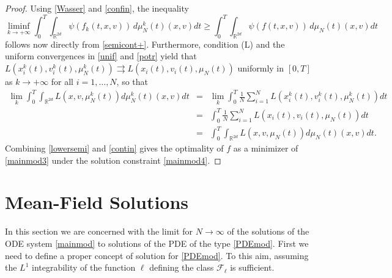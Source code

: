 \documentclass[11pt]{article}
\theoremstyle{plain}
\theoremstyle{definition}
\theoremstyle{remark}
\numberwithin{equation}{section}
\begin{document}
\begin{proof}
Using \eqref{Wasser} and \eqref{confin}, the inequality
\begin{equation}\label{lowersemi}
\liminf_{k\to +\infty}\int_{0}^T \int_{\mathbb R^{2d}} \psi(f_k(t,x,v))\, d \mu_N^k(t)(x,v) dt \ge \int_{0}^T \int_{\mathbb R^{2d}} \psi(f(t,x,v))\, d \mu_N(t)(x,v) dt
\end{equation}
follows now directly from \eqref{semicont+}. Furthermore, condition (L) and the uniform convergences in \eqref{unif} and \eqref{potr} yield that $L(x_i^k(t),v_i^k(t),\mu_N^k(t))\rightrightarrows L(x_i(t),v_i(t),\mu_N(t))$ uniformly in $[0, T]$ as $k \to +\infty$ for all $i=1, \dots, N$, so that
\begin{eqnarray}
\lim_k \int_{0}^T \int_{\mathbb R^{2d}} L(x,v,\mu_N^k(t)) d\mu_N^k(t)(x,v) dt &=& \lim_k \int_{0}^T \frac{1}{N} \sum_{i=1}^N  L(x_i^k(t),v_i^k(t),\mu_N^k(t)) dt \nonumber\\
&=& \int_{0}^T \frac{1}{N} \sum_{i=1}^N  L(x_i(t),v_i(t),\mu_N(t)) dt \nonumber \\
&=& \int_{0}^T \int_{\mathbb R^{2d}} L(x,v,\mu_N(t)) d\mu_N(t)(x,v) dt. \label{contin}
\end{eqnarray}
Combining \eqref{lowersemi} and \eqref{contin} gives the optimality of $f$ as a minimizer of \eqref{mainmod3} under the solution constraint \eqref{mainmod4}.
\end{proof}



\section{Mean-Field Solutions}\label{sec:meanfield}

In this section we are concerned with the limit for $N \to \infty$ of the solutions of the ODE system \eqref{mainmod} to solutions of the PDE of the type \eqref{PDEmod}. First we need to define a proper concept of
solution for \eqref{PDEmod}. To this aim, assuming the $L^1$ integrability of the function $\ell$ defining the class $\mathcal F_\ell$ is sufficient.
\end{document}
